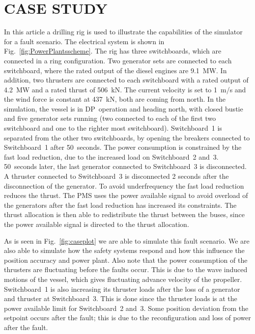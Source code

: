 \documentclass[twocolumn,10pt]{asme2e}
\begin{document}
\section*{\uppercase{Case Study}}
In this article a drilling rig is used to illustrate the capabilities of the simulator for a fault scenario.
The electrical system is shown in Fig.~\ref{fig:PowerPlantsscheme}.
The rig has three switchboards, which are connected in a ring configuration.
Two generator sets are connected to each switchboard, where the rated output of the diesel engines are 9.1~MW.
In addition, two thrusters are connected to each switchboard with a rated output of 4.2~MW and a rated thrust of 506~kN.
The current velocity is set to 1~m/s and the wind force is constant at 437~kN, both are coming from north.
In the simulation, the vessel is in DP~operation and heading north, with closed bustie and five generator sets running (two connected to each of the first two switchboard and one to the righter most switchboard).
Switchboard~1 is separated from the other two switchboards, by opening the breakers connected to Switchboard~1 after 50~seconds.
The power consumption is constrained by the fast load reduction, due to the increased load on Switchboard~2 and~3.
50~seconds later, the last generator connected to Switchboard~3 is disconnected.
A thruster connected to Switchboard~3 is disconnected 2 seconds after the disconnection of the generator.
To avoid underfrequency the fast load reduction reduces the thrust.
The PMS uses the power available signal to avoid overload of the generators after the fast load reduction has increased its constraints.
The thrust allocation is then able to redistribute the thrust between the buses, since the power available signal is directed to the thrust allocation.

As is seen in Fig.~\ref{fig:caseplot} we are able to simulate this fault scenario.
We are also able to simulate how the safety systems respond and how this influence the position accuracy and power plant.
Also note that the power consumption of the thrusters are fluctuating before the faults occur.
This is due to the wave induced motions of the vessel, which gives fluctuating advance velocity of the propeller.
Switchboard~1 is also increasing its thruster loads after the loss of a generator and thruster at Switchboard~3.
This is done since the thruster loads is at the power available limit for Switchboard~2 and~3.
Some position deviation from the setpoint occurs after the fault; this is due to the reconfiguration and loss of power after the fault.
\end{document}

